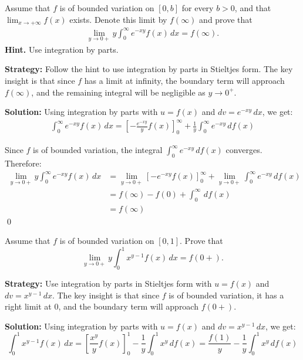 \begin{problembox}
Assume that $f$ is of bounded variation on $[0, b]$ for every $b > 0$, and that $\lim_{x \to +\infty} f(x)$ exists. Denote this limit by $f(\infty)$ and prove that
\begin{align*}
\lim_{y \to 0+} y \int_0^\infty e^{-xy}f(x) \, dx = f(\infty).
\end{align*}
\textbf{Hint.} Use integration by parts.
\end{problembox}

\noindent\textbf{Strategy:} Follow the hint to use integration by parts in Stieltjes form. The key insight is that since $f$ has a limit at infinity, the boundary term will approach $f(\infty)$, and the remaining integral will be negligible as $y \to 0^+$.

\bigskip\noindent\textbf{Solution:}
Using integration by parts with $u = f(x)$ and $dv = e^{-xy} \, dx$, we get:
\begin{align*}
\int_0^\infty e^{-xy}f(x) \, dx = \left[-\frac{e^{-xy}}{y} f(x)\right]_0^\infty + \frac{1}{y} \int_0^\infty e^{-xy} \, df(x)
\end{align*}

Since $f$ is of bounded variation, the integral $\int_0^\infty e^{-xy} \, df(x)$ converges. Therefore:
\begin{align*}
\lim_{y \to 0+} y \int_0^\infty e^{-xy}f(x) \, dx &= \lim_{y \to 0+} \left[-e^{-xy} f(x)\right]_0^\infty + \lim_{y \to 0+} \int_0^\infty e^{-xy} \, df(x) \\
&= f(\infty) - f(0) + \int_0^\infty \, df(x) \\
&= f(\infty)
\end{align*}\qed


\begin{problembox}
Assume that $f$ is of bounded variation on $[0, 1]$. Prove that
\[\lim_{y \to 0+} y \int_0^1 x^{y-1}f(x) \, dx = f(0+).\]
\end{problembox}

\noindent\textbf{Strategy:} Use integration by parts in Stieltjes form with $u = f(x)$ and $dv = x^{y-1} \, dx$. The key insight is that since $f$ is of bounded variation, it has a right limit at $0$, and the boundary term will approach $f(0+)$.

\bigskip\noindent\textbf{Solution:}
Using integration by parts with $u = f(x)$ and $dv = x^{y-1} \, dx$, we get:
\[\int_0^1 x^{y-1}f(x) \, dx = \left[\frac{x^y}{y} f(x)\right]_0^1 - \frac{1}{y} \int_0^1 x^y \, df(x) = \frac{f(1)}{y} - \frac{1}{y} \int_0^1 x^y \, df(x)\]

